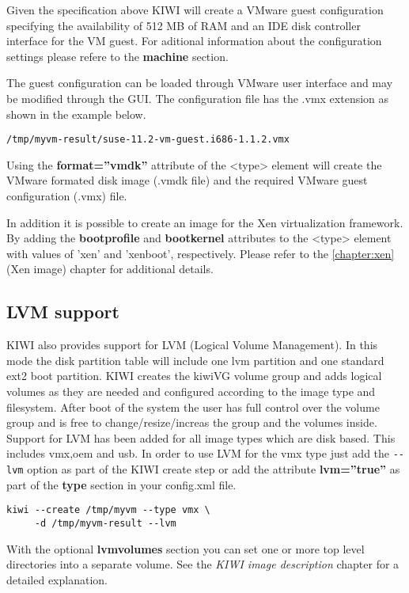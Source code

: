 Given the specification above KIWI will create a VMware guest
configuration specifying the availability of 512 MB of RAM and an IDE 
disk controller interface for the VM guest. For aditional information
about the configuration settings please refere to the 
\textbf{machine} section. 

The guest configuration can be loaded through VMware user interface and 
may be modified through the GUI. The configuration file has the .vmx 
extension as shown in the example below.

\begin{Command}{13cm}
\begin{verbatim}
/tmp/myvm-result/suse-11.2-vm-guest.i686-1.1.2.vmx
\end{verbatim}
\end{Command}

Using the \textbf{format=''vmdk''} attribute of the <type> element
will create the VMware formated disk image (.vmdk file) and the required 
VMware guest configuration (.vmx) file.

In addition it is possible to create an image for the Xen virtualization 
framework.  By adding the \textbf{bootprofile} and \textbf{bootkernel} 
attributes to the <type> element with values of 'xen' and 'xenboot', 
respectively. Please refer to the \ref{chapter:xen} (Xen image) chapter 
for additional details.

\subsection{LVM support}

KIWI also provides support for LVM (Logical Volume Management). In this
mode the disk partition table will include one lvm partition and one
standard ext2 boot partition. KIWI creates the kiwiVG volume group and
adds logical volumes as they are needed and configured according to the
image type and filesystem. After boot of the system the user has full
control over the volume group and is free to change/resize/increas the
group and the volumes inside. Support for LVM has been added for all
image types which are disk based. This includes vmx,oem and usb.
In order to use LVM for the vmx type just add the \verb+--lvm+ option
as part of the KIWI create step or add the attribute \textbf{lvm=''true''}
as part of the \textbf{type} section in your config.xml file.

\begin{Command}{12cm}
\begin{verbatim}
kiwi --create /tmp/myvm --type vmx \
     -d /tmp/myvm-result --lvm
\end{verbatim}
\end{Command}

With the optional \textbf{lvmvolumes} section you can set one or
more top level directories into a separate volume. See the
\textit{KIWI image description} chapter for a detailed explanation.
